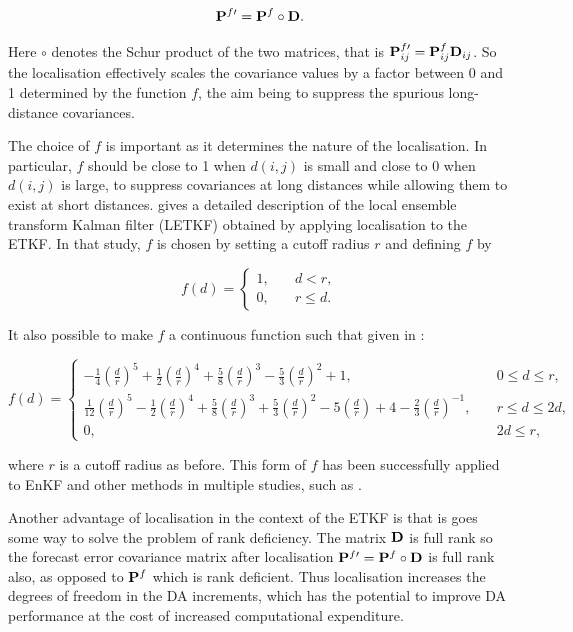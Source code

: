 \begin{equation}
\mathbf{P}^{f\prime} = \mathbf{P}^f \circ \mathbf{D}.
\end{equation}

Here $\circ$ denotes the Schur product of the two matrices, that is $\mathbf{P}^{f\prime}_{ij} = \mathbf{P}^f_{ij} \mathbf{D}_{ij}$. So the localisation effectively scales the covariance values by a factor between 0 and 1 determined by the function $f$, the aim being to suppress the spurious long-distance covariances.

The choice of $f$ is important as it determines the nature of the localisation. In particular, $f$ should be close to 1 when $d(i,j)$ is small and close to 0 when $d(i,j)$ is large, to suppress covariances at long distances while allowing them to exist at short distances. \citet{Hunt2007} gives a detailed description of the local ensemble transform Kalman filter (LETKF) obtained by applying localisation to the ETKF. In that study, $f$ is chosen by setting a cutoff radius $r$ and defining $f$ by

\[
f(d) = \begin{cases}
	1, \quad &d < r, \\
	0, &r \leq d.
\end{cases}
\]

It also possible to make $f$ a continuous function such that given in \citet{Gaspari1999}:

\[
f(d) = \begin{cases}
	- \frac 1 4 \left(\frac d r \right)^5 + \frac 1 2 \left(\frac d r \right)^4 + \frac 5 8 \left(\frac d r \right)^3 - \frac 5 3 \left(\frac d r \right)^2 + 1, &0 \leq d \leq r, \\
	 \frac{1}{12} \left(\frac d r \right)^5 - \frac 1 2 \left(\frac d r \right)^4 + \frac 5 8 \left(\frac d r \right)^3 + \frac 5 3 \left(\frac d r \right)^2 - 5 \left(\frac d r \right) + 4 - \frac 2 3 \left(\frac d r \right)^{-1}, \quad &r \leq d \leq 2d, \\
	0, &2d \leq r,
\end{cases}
\]

where $r$ is a cutoff radius as before. This form of $f$ has been successfully applied to EnKF and other methods in multiple studies, such as \citet{Hamill2001,Houtekamer2001,Whitaker2002}.

Another advantage of localisation in the context of the ETKF is that is goes some way to solve the problem of rank deficiency. The matrix $\mathbf{D}$ is full rank so the forecast error covariance matrix after localisation $\mathbf{P}^{f\prime} = \mathbf{P}^f \circ \mathbf{D}$ is full rank also, as opposed to $\mathbf{P}^f$ which is rank deficient. Thus localisation increases the degrees of freedom in the DA increments, which has the potential to improve DA performance at the cost of increased computational expenditure.

